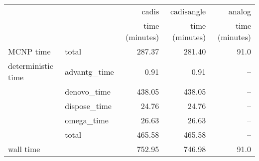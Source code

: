 \begin{tabular}{llrrr}
\toprule
          &              &          cadis &     cadisangle &         analog \\
          &              & time (minutes) & time (minutes) & time (minutes) \\
\midrule
MCNP time & total &         287.37 &         281.40 &           91.0 \\
deterministic time & advantg\_time &           0.91 &           0.91 &            -- \\
          & denovo\_time &         438.05 &         438.05 &            -- \\
          & dispose\_time &          24.76 &          24.76 &            -- \\
          & omega\_time &          26.63 &          26.63 &            -- \\
          & total &         465.58 &         465.58 &            -- \\
wall time &              &         752.95 &         746.98 &           91.0 \\
\bottomrule
\end{tabular}
